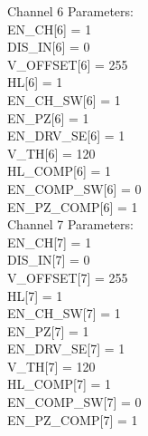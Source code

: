 Channel 6 Parameters:\\

EN\_CH[6]      = 1\\
DIS\_IN[6]     = 0\\
V\_OFFSET[6]   = 255\\
HL[6]         = 1\\
EN\_CH_SW[6]   = 1\\
EN\_PZ[6]      = 1\\
EN\_DRV_SE[6]  = 1\\
V\_TH[6]       = 120\\
HL\_COMP[6]    = 1\\
EN\_COMP_SW[6] = 0\\
EN\_PZ_COMP[6] = 1\\

Channel 7 Parameters:\\

EN\_CH[7]      = 1\\
DIS\_IN[7]     = 0\\
V\_OFFSET[7]   = 255\\
HL[7]         = 1\\
EN\_CH_SW[7]   = 1\\
EN\_PZ[7]      = 1\\
EN\_DRV_SE[7]  = 1\\
V\_TH[7]       = 120\\
HL\_COMP[7]    = 1\\
EN\_COMP_SW[7] = 0\\
EN\_PZ_COMP[7] = 1\\

